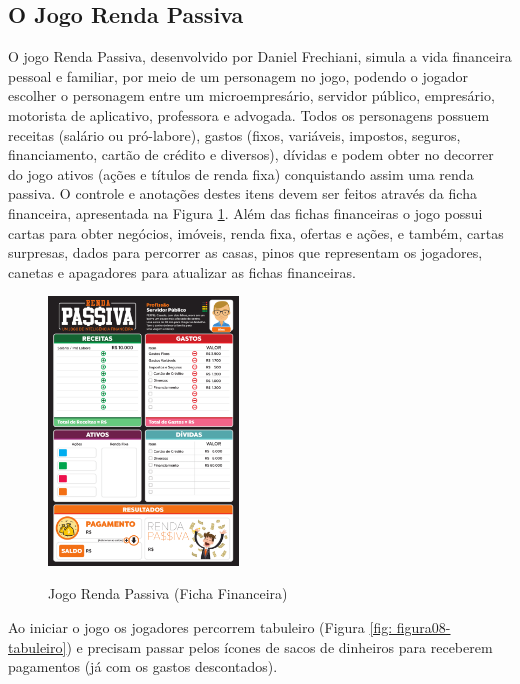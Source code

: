 \subsection{O Jogo Renda Passiva}
O jogo Renda Passiva, desenvolvido por Daniel Frechiani, simula a vida financeira pessoal e familiar, por meio de um personagem no jogo, podendo o jogador escolher o personagem entre um microempresário, servidor público, empresário, motorista de aplicativo, professora e advogada. Todos os personagens possuem receitas (salário ou pró-labore), gastos (fixos, variáveis, impostos, seguros, financiamento, cartão de crédito e diversos), dívidas e podem obter no decorrer do jogo ativos (ações e títulos de renda fixa) conquistando assim uma renda passiva. O controle e anotações destes itens devem ser feitos através da ficha financeira, apresentada na Figura \ref{fig: figura07-ficha-financeira}. Além das fichas financeiras o jogo possui cartas para obter negócios, imóveis, renda fixa, ofertas e ações, e também, cartas surpresas, dados para percorrer as casas, pinos que representam os jogadores, canetas e apagadores para atualizar as fichas financeiras.

\graphicspath{{figuras/}}
\begin{figure}[!ht]
\centering
\begin{minipage}{1.\textwidth}
\caption{Jogo Renda Passiva (Ficha Financeira)}
\centering
\includegraphics[width=0.45\textwidth]{07-figura_ficha-financeira-renda-passiva}
\label{fig: figura07-ficha-financeira}
\end{minipage}
\end{figure}

Ao iniciar o jogo os jogadores percorrem tabuleiro (Figura \ref{fig: figura08-tabuleiro}) e precisam passar pelos ícones de sacos de dinheiros para receberem pagamentos (já com os gastos descontados).

